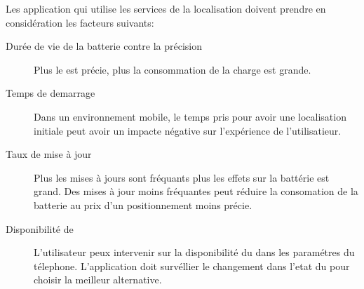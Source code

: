 Les application qui utilise les services de la localisation doivent prendre en considération les facteurs suivants:
\begin{description}
\item[Durée de vie de la batterie contre la précision] Plus le  est précie, plus la consommation de la charge est grande.
\item[Temps de demarrage] Dans un environnement mobile, le temps pris pour avoir une localisation initiale peut avoir un impacte négative sur l'expérience de l'utilisatieur.
\item[Taux de mise à jour] Plus les mises à jours sont fréquants plus les effets sur la battérie est grand. Des mises à jour moins fréquantes peut réduire la consomation de la batterie au prix d'un positionnement moins précie.
\item[Disponibilité de ] L'utilisateur peux intervenir sur la disponibilité du  dans les paramétres du télephone. L'application doit  survéllier le changement dans l'etat du  pour choisir la meilleur alternative.
\end{description}